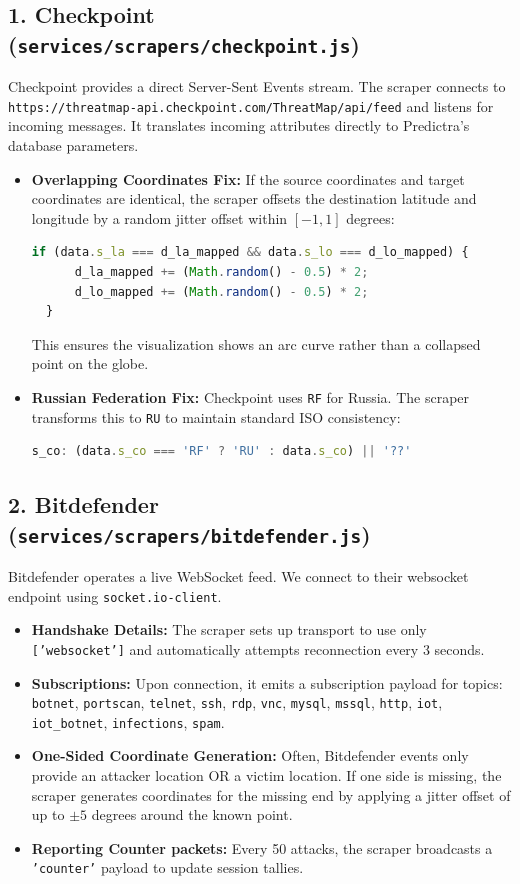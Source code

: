 \documentclass[11pt,a4paper]{report}
\begin{document}
\subsection{1. Checkpoint (\texttt{services/scrapers/checkpoint.js})}
Checkpoint provides a direct Server-Sent Events stream. The scraper connects to \texttt{https://threatmap-api.checkpoint.com/ThreatMap/api/feed} and listens for incoming messages. It translates incoming attributes directly to Predictra's database parameters.
\begin{itemize}
  \item \textbf{Overlapping Coordinates Fix:} If the source coordinates and target coordinates are identical, the scraper offsets the destination latitude and longitude by a random jitter offset within $[-1, 1]$ degrees:
  \begin{lstlisting}[language=JavaScript]
  if (data.s_la === d_la_mapped && data.s_lo === d_lo_mapped) {
      d_la_mapped += (Math.random() - 0.5) * 2;
      d_lo_mapped += (Math.random() - 0.5) * 2;
  }
  \end{lstlisting}
  This ensures the visualization shows an arc curve rather than a collapsed point on the globe.
  \item \textbf{Russian Federation Fix:} Checkpoint uses \texttt{RF} for Russia. The scraper transforms this to \texttt{RU} to maintain standard ISO consistency:
  \begin{lstlisting}[language=JavaScript]
  s_co: (data.s_co === 'RF' ? 'RU' : data.s_co) || '??'
  \end{lstlisting}
\end{itemize}

\subsection{2. Bitdefender (\texttt{services/scrapers/bitdefender.js})}
Bitdefender operates a live WebSocket feed. We connect to their websocket endpoint using \texttt{socket.io-client}.
\begin{itemize}
  \item \textbf{Handshake Details:} The scraper sets up transport to use only \texttt{['websocket']} and automatically attempts reconnection every 3 seconds.
  \item \textbf{Subscriptions:} Upon connection, it emits a subscription payload for topics: \texttt{botnet}, \texttt{portscan}, \texttt{telnet}, \texttt{ssh}, \texttt{rdp}, \texttt{vnc}, \texttt{mysql}, \texttt{mssql}, \texttt{http}, \texttt{iot}, \texttt{iot\_botnet}, \texttt{infections}, \texttt{spam}.
  \item \textbf{One-Sided Coordinate Generation:} Often, Bitdefender events only provide an attacker location OR a victim location. If one side is missing, the scraper generates coordinates for the missing end by applying a jitter offset of up to $\pm 5$ degrees around the known point.
  \item \textbf{Reporting Counter packets:} Every 50 attacks, the scraper broadcasts a \texttt{'counter'} payload to update session tallies.
\end{itemize}
\end{document}
